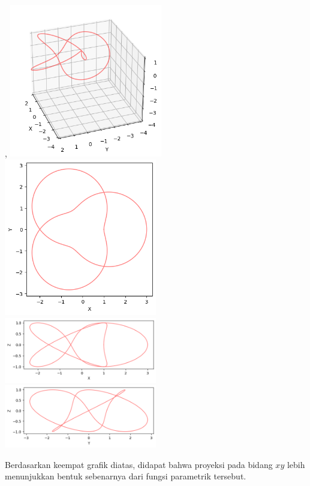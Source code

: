 \documentclass[twoside]{scrarticle}
\begin{document}
\begin{enumerate}
		\begin{minipage}{\linewidth}, 
			\includegraphics[width=0.5\textwidth]{50.png}
			\includegraphics[width=0.5\textwidth]{50_1.png}
			\includegraphics[width=0.5\textwidth]{50_2.png}
			\includegraphics[width=0.5\textwidth]{50_3.png}
		\end{minipage}
		
		Berdasarkan keempat grafik diatas, didapat bahwa proyeksi pada bidang $xy$ lebih menunjukkan bentuk sebenarnya dari fungsi parametrik tersebut.
		
	\end{enumerate}
\end{document}
